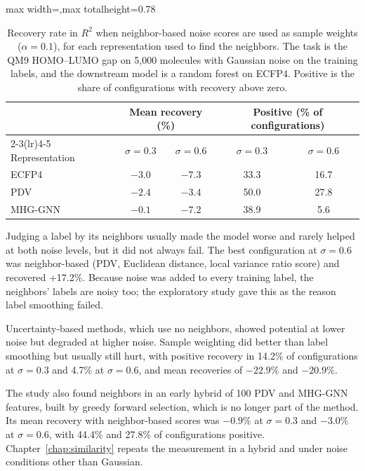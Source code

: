 \begin{table}[htbp]
\centering
\begin{adjustbox}{max width=\textwidth,max totalheight=0.78\textheight}
\begin{tabular}{lcccc}
\toprule
 & \multicolumn{2}{c}{Mean recovery (\%)} & \multicolumn{2}{c}{Positive (\% of configurations)} \\
\cmidrule(lr){2-3}\cmidrule(lr){4-5}
Representation & $\sigma = 0.3$ & $\sigma = 0.6$ & $\sigma = 0.3$ & $\sigma = 0.6$ \\
\midrule
ECFP4   & $-3.0$ & $-7.3$ & 33.3 & 16.7 \\
PDV     & $-2.4$ & $-3.4$ & 50.0 & 27.8 \\
MHG-GNN & $-0.1$ & $-7.2$ & 38.9 & 5.6 \\
\bottomrule
\end{tabular}
\end{adjustbox}
\caption[Recovery with neighbor-based sample weights by representation.]{Recovery rate in $R^2$ when neighbor-based noise scores are used as sample weights ($\alpha = 0.1$), for each representation used to find the neighbors. The task is the QM9 HOMO--LUMO gap on 5,000 molecules with Gaussian noise on the training labels, and the downstream model is a random forest on ECFP4. Positive is the share of configurations with recovery above zero.}
\label{tab:code_input_neighbor_recovery}
\end{table}

Judging a label by its neighbors usually made the model worse and rarely helped at both noise levels, but it did not always fail. The best configuration at $\sigma = 0.6$ was neighbor-based (PDV, Euclidean distance, local variance ratio score) and recovered +17.2\%. Because noise was added to every training label, the neighbors' labels are noisy too; the exploratory study gave this as the reason label smoothing failed.

Uncertainty-based methods, which use no neighbors, showed potential at lower noise but degraded at higher noise. Sample weighting did better than label smoothing but usually still hurt, with positive recovery in 14.2\% of configurations at $\sigma = 0.3$ and 4.7\% at $\sigma = 0.6$, and mean recoveries of $-22.9\%$ and $-20.9\%$.

The study also found neighbors in an early hybrid of 100 PDV and MHG-GNN features, built by greedy forward selection, which is no longer part of the method. Its mean recovery with neighbor-based scores was $-0.9\%$ at $\sigma = 0.3$ and $-3.0\%$ at $\sigma = 0.6$, with 44.4\% and 27.8\% of configurations positive. Chapter~\ref{chap:similarity} repeats the measurement in a hybrid and under noise conditions other than Gaussian.

